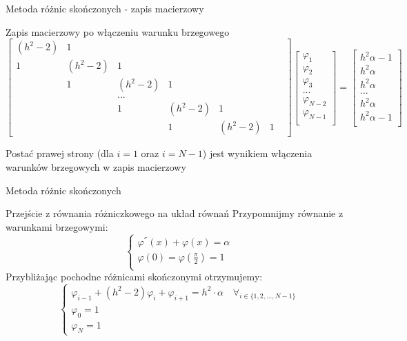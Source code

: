\begin{frame}{Metoda różnic skończonych - zapis macierzowy}
	\begin{exampleblock}{Zapis macierzowy po włączeniu warunku brzegowego}
	{\scriptsize
	$$
	\begin{bmatrix}
	(h^2 -2) & 1 &  &  &  &  & \\ 
	1&  (h^2 -2)& 1 &  &  &  & \\ 
	& 1 &  (h^2 -2)& 1 &  &  & \\ 
	&  &  ...& &  &  & \\ 
	&  & 1 & (h^2 -2) &  1& & \\ 
	&  &  & 1 &  (h^2 -2)& 1 &
	\end{bmatrix}		
	\begin{bmatrix}
	\varphi_1 \\
	\varphi_2 \\
	\varphi_3 \\
	...\\
	\varphi_{N-2}\\
	\varphi_{N-1}\\
	\end{bmatrix}		
	= 		
	\begin{bmatrix} 
	h^2\alpha -1 \\
	h^2\alpha\\
	h^2\alpha\\
	... \\
	h^2\alpha\\
	h^2\alpha - 1\\
	\end{bmatrix}
	$$}
	
	Postać prawej strony (dla $i = 1$ oraz $i = N-1$) jest wynikiem włączenia warunków brzegowych w zapis macierzowy
	\end{exampleblock}
\end{frame}
\begin{frame}{Metoda różnic skończonych}
	\begin{exampleblock}{Przejście z równania różniczkowego na układ równań}
		Przypomnijmy równanie z warunkami brzegowymi:
		$$
		\begin{cases}
		\varphi^{''}(x) + \varphi(x) = \alpha \\
		\varphi(0) = \varphi(\frac{\pi}{2}) = 1 \\
		\end{cases}
		$$
		Przybliżając pochodne różnicami skończonymi otrzymujemy:
		$$
		\begin{cases}
		\varphi_{i-1} + (h^2 - 2)\varphi_i + \varphi_{i+1} = h^2 \cdot \alpha \quad \forall_{i \in \{1,2, ..., N-1\}} \\
		\varphi_0 = 1 \\
		\varphi_N = 1
		\end{cases}
		$$
	\end{exampleblock}	
\end{frame}





